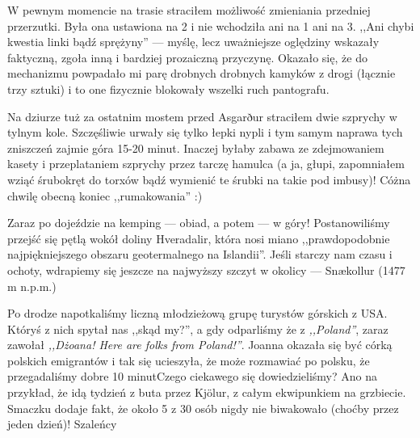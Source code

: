 W pewnym momencie na trasie straciłem możliwość zmieniania przedniej przerzutki. Była ona ustawiona na 2 i nie wchodziła ani na 1 ani na 3. ,,Ani chybi kwestia linki bądź sprężyny'' --- myślę, lecz uważniejsze oględziny wskazały faktyczną, zgoła inną i bardziej prozaiczną przyczynę. Okazało się, że do mechanizmu powpadało mi parę drobnych drobnych kamyków z drogi (łącznie trzy sztuki) i to one fizycznie blokowały wszelki ruch pantografu.

Na dziurze tuż za ostatnim mostem przed Asgarður straciłem dwie szprychy w tylnym kole. Szczęśliwie urwały się tylko łepki nypli i tym samym naprawa tych zniszczeń zajmie góra 15-20 minut. Inaczej byłaby zabawa ze zdejmowaniem kasety i przeplataniem szprychy przez tarczę hamulca (a ja, głupi, zapomniałem wziąć śrubokręt do torxów bądź wymienić te śrubki na takie pod imbusy)! Cóż\textellipsis na chwilę obecną koniec ,,rumakowania'' :)


Zaraz po dojeździe na kemping --- obiad, a potem --- w góry! Postanowiliśmy przejść się pętlą wokół doliny Hveradalir, która nosi miano ,,prawdopodobnie najpiękniejszego obszaru geotermalnego na Islandii''. Jeśli starczy nam czasu i ochoty, wdrapiemy się jeszcze na najwyższy szczyt w okolicy --- Snækollur (1477 m n.p.m.)

Po drodze napotkaliśmy liczną młodzieżową grupę turystów górskich z USA. Któryś z nich spytał nas ,,skąd my?'', a gdy odparliśmy że z \emph{,,Poland''}, zaraz zawołał \emph{,,Dżoana! Here are folks from Poland!''}. Joanna okazała się być córką polskich emigrantów i tak się ucieszyła, że może rozmawiać po polsku, że przegadaliśmy dobre 10 minut\textellipsis Czego ciekawego się dowiedzieliśmy? Ano na przykład, że idą tydzień z buta przez Kjölur, z całym ekwipunkiem na grzbiecie. Smaczku dodaje fakt, że około 5 z 30 osób nigdy nie biwakowało (choćby przez jeden dzień)! Szaleńcy\textellipsis


